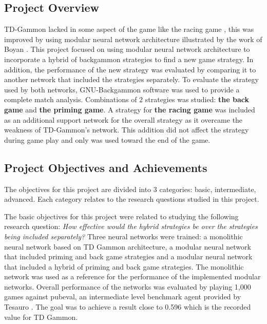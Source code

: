 \documentclass[12pt,a4paper]{article}
\begin{document}
\subsection{Project Overview}
TD-Gammon lacked in some aspect of the game like the racing game \cite{survey}, this was improved by using modular neural network architecture illustrated by the work of Boyan \citeyear{boyan}. This project focused on using modular neural network architecture to incorporate a hybrid of backgammon strategies to find a new game strategy. In addition, the performance of the new strategy was evaluated by comparing it to another network that included the strategies separately. To evaluate the strategy used by both networks, GNU-Backgammon software was used to provide a complete match analysis. Combinations of 2 strategies was studied: \textbf{the back game} and \textbf{the priming game}. A strategy for \textbf{the racing game} was included as an additional support network for the overall strategy as it overcame the weakness of TD-Gammon's network. This addition did not affect the strategy during game play and only was used toward the end of the game. 

\subsection{Project Objectives and Achievements}
The objectives for this project are divided into 3 categories: basic, intermediate, advanced. Each category relates to the research questions studied in this project.

The basic objectives for this project were related to studying the following research question: \textit{How effective would the hybrid strategies be over the strategies being included separately?} Three neural networks were trained: a monolithic neural network based on TD Gammon architecture, a modular neural network that included priming and back game strategies and a modular neural network that included a hybrid of priming and back game strategies. The monolithic network was used as a reference for the performance of the implemented modular networks. Overall performance of the networks was evaluated by playing 1,000 games against pubeval, an intermediate level benchmark agent provided by Tesauro \citeyear{pubeval}. The goal was to achieve a result close to 0.596 which is the recorded value for TD Gammon. 
\end{document}
